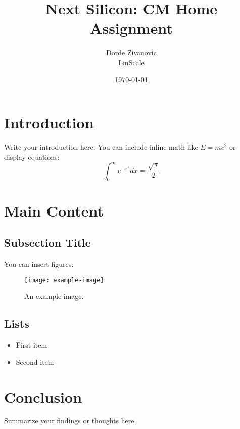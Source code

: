 \documentclass[12pt]{article}
\title{Next Silicon: CM Home Assignment}
\author{Dorde Zivanovic \\ \small{LinScale}}
\date{\today}
\begin{document}
\maketitle
\tableofcontents
\newpage

\section{Introduction}
Write your introduction here. You can include inline math like $E = mc^2$ or display equations:
\begin{equation}
    \int_0^\infty e^{-x^2} dx = \frac{\sqrt{\pi}}{2}
\end{equation}

\section{Main Content}
\subsection{Subsection Title}
You can insert figures:
\begin{figure}[h!]
    \centering
    \texttt{[image: example-image]}
    \caption{An example image.}
    \label{fig:example}
\end{figure}

\subsection{Lists}
\begin{itemize}
    \item First item
    \item Second item
\end{itemize}

\section{Conclusion}
Summarize your findings or thoughts here.
\cite{lamport1994}


\end{document}
